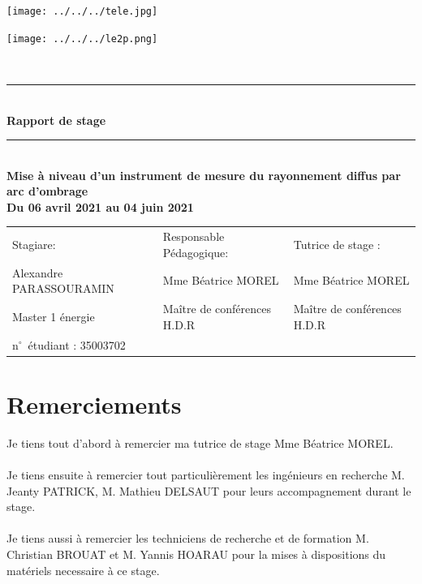 \documentclass[12pt,a4paper]{article}
\begin{document}
\begin{titlepage}
\begin{minipage}[c]{.46\linewidth}
     \begin{center}
         \texttt{[image: ../../../tele.jpg]}   
         
         \end{center}
   \end{minipage} \hfill
   \begin{minipage}[c]{.46\linewidth}
    \begin{center}
       \texttt{[image: ../../../le2p.png]}   
        \end{center}
 \end{minipage}
\newcommand{\HRule}{\rule{\linewidth}{0.5mm}}
\center
\textsc{\LARGE} \\[3cm]

\HRule \\[0.4cm]
{ \huge \bfseries Rapport de stage\\ [0.15cm] }
\HRule \\[1cm]

\textbf{ Mise à niveau d'un instrument de mesure du rayonnement diffus par arc d’ombrage}\\[1cm]
\textbf{ Du 06 avril 2021 au 04 juin 2021}\\[8cm]
\begin{tabular}{lll}
   \sf Stagiare: &\sf Responsable Pédagogique: &\sf Tutrice de stage : \\
  \sf Alexandre PARASSOURAMIN &\sf Mme Béatrice MOREL &\sf Mme Béatrice MOREL \\
   \sf Master 1 énergie& \sf Maître de conférences H.D.R & \sf Maître de conférences H.D.R\\
  \sf n$^\circ$~étudiant : 35003702& & \\
\end{tabular}




\end{titlepage}
\newpage
\thispagestyle{empty}

\section*{Remerciements}
\sf
Je tiens tout d'abord à remercier ma tutrice de stage Mme Béatrice MOREL.\\
~\\
Je tiens ensuite à remercier tout particulièrement les ingénieurs en recherche M. Jeanty PATRICK, M. Mathieu DELSAUT pour leurs accompagnement durant le stage.\\
~\\
Je tiens aussi à remercier les techniciens de recherche et de formation M. Christian BROUAT  et M. Yannis HOARAU pour la mises à dispositions du matériels necessaire à ce stage.
 
\end{document}
